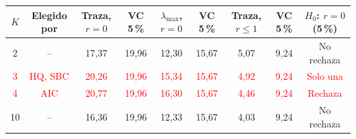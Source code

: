 \begin{tabular}{ccccccccc}
\toprule
$K$ & Elegido por & Traza, $r=0$ & VC 5\,\% & $\lambda_{\max}$, $r=0$ & VC 5\,\% & Traza, $r\leq1$ & VC 5\,\% & $H_0$: $r=0$ (5\,\%)
\\ \midrule
2 & -- & 17{,}37 & 19{,}96 & 12{,}30 & 15{,}67 & 5{,}07 & 9{,}24 & No rechaza \\
\textcolor{red}{3} & \textcolor{red}{HQ, SBC} & \textcolor{red}{20{,}26} & \textcolor{red}{19{,}96} & \textcolor{red}{15{,}34} & \textcolor{red}{15{,}67} & \textcolor{red}{4{,}92} & \textcolor{red}{9{,}24} & \textcolor{red}{Solo una} \\
\textcolor{red}{4} & \textcolor{red}{AIC} & \textcolor{red}{20{,}77} & \textcolor{red}{19{,}96} & \textcolor{red}{16{,}30} & \textcolor{red}{15{,}67} & \textcolor{red}{4{,}46} & \textcolor{red}{9{,}24} & \textcolor{red}{Rechaza} \\
10 & -- & 16{,}36 & 19{,}96 & 12{,}33 & 15{,}67 & 4{,}03 & 9{,}24 & No rechaza \\
\bottomrule
\end{tabular}
